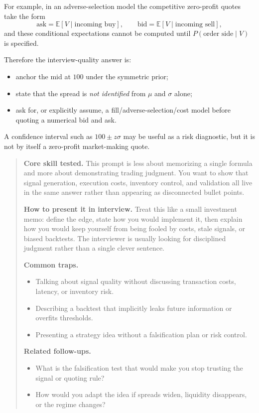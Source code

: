 \documentclass[11pt,letterpaper,openany]{book}
\newenvironment{EditorialNote}
  {\begin{quote}\small\setlength{\parskip}{0.25em}}
  {\end{quote}}
\newcommand{\QuestionSpacer}{\vspace{0.4em}}
\begin{document}
For example, in an adverse-selection model the competitive zero-profit quotes take the form
\[
\text{ask}=\mathbb E[V\mid\text{incoming buy}],
\qquad
\text{bid}=\mathbb E[V\mid\text{incoming sell}],
\]
and these conditional expectations cannot be computed until \(P(\text{order side}\mid V)\) is specified.

Therefore the interview-quality answer is:
\begin{itemize}
\item anchor the mid at \(100\) under the symmetric prior;
\item state that the spread is \emph{not identified} from \(\mu\) and \(\sigma\) alone;
\item ask for, or explicitly assume, a fill/adverse-selection/cost model before quoting a numerical bid and ask.
\end{itemize}
A confidence interval such as \(100\pm z\sigma\) may be useful as a risk diagnostic, but it is not by itself a zero-profit market-making quote.

\begin{EditorialNote}


\textbf{Core skill tested.} This prompt is less about memorizing a single formula and more about demonstrating trading judgment. You want to show that signal generation, execution costs, inventory control, and validation all live in the same answer rather than appearing as disconnected bullet points.

\textbf{How to present it in interview.} Treat this like a small investment memo: define the edge, state how you would implement it, then explain how you would keep yourself from being fooled by costs, stale signals, or biased backtests. The interviewer is usually looking for disciplined judgment rather than a single clever sentence.

\textbf{Common traps.}
\begin{itemize}
\item Talking about signal quality without discussing transaction costs, latency, or inventory risk.
\item Describing a backtest that implicitly leaks future information or overfits thresholds.
\item Presenting a strategy idea without a falsification plan or risk control.
\end{itemize}

\textbf{Related follow-ups.}
\begin{itemize}
\item What is the falsification test that would make you stop trusting the signal or quoting rule?
\item How would you adapt the idea if spreads widen, liquidity disappears, or the regime changes?
\end{itemize}


\end{EditorialNote}
\QuestionSpacer
\end{document}
